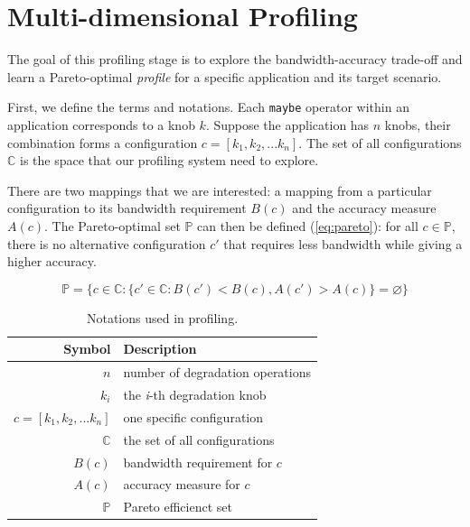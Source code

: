 \section{Multi-dimensional Profiling}
\label{sec:profiling}

The goal of this profiling stage is to explore the bandwidth-accuracy trade-off
and learn a Pareto-optimal \textit{profile} for a specific application and its
target scenario.

First, we define the terms and notations. Each \texttt{maybe} operator within an
application corresponds to a knob $k$. Suppose the application has $n$ knobs,
their combination forms a configuration $c = [k_{1}, k_{2}, ... k_{n}]$. The set
of all configurations $\mathbb{C}$ is the space that our profiling system need
to explore.

There are two mappings that we are interested: a mapping from a particular
configuration to its bandwidth requirement $B(c)$ and the accuracy measure
$A(c)$. The Pareto-optimal set $\mathbb{P}$ can then be defined
(\autoref{eq:pareto}): for all $c \in \mathbb{P}$, there is no alternative
configuration $c'$ that requires less bandwidth while giving a higher accuracy.

{\small
\begin{equation}
  \mathbb{P} = \{ c \in \mathbb{C} : \{ c' \in \mathbb{C}: B(c') < B(c),
  A(c') > A(c) \} = \varnothing\}
  \label{eq:pareto}
\end{equation}
}%

\begin{table}
  \centering
  \begin{tabular}{r l}
    \toprule
    \textbf{Symbol} & \textbf{Description} \\
    \midrule
    $n$ & number of degradation operations \\
    $k_i$ & the \textit{i}-th degradation knob \\
    $c = [k_{1}, k_{2}, ... k_{n}]$ & one specific configuration \\
    $\mathbb{C}$ & the set of all configurations \\
    \midrule
    $B(c)$ & bandwidth requirement for $c$ \\
    $A(c)$ & accuracy measure for $c$ \\
    $\mathbb{P}$ & Pareto efficienct set \\
    \bottomrule
  \end{tabular}
  \caption{Notations used in profiling.}
  \label{tab:notations}
\end{table}

